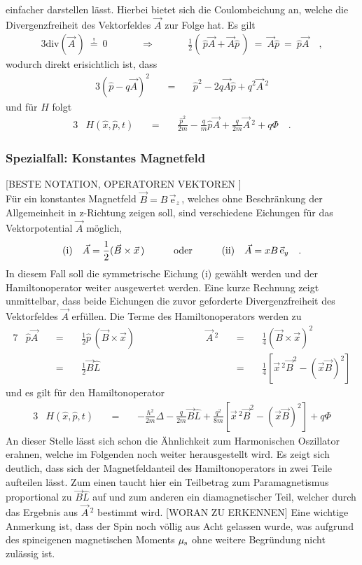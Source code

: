 \documentclass[a4paper,11pt, twoside]{article}
\newcommand{\+}{\dagger}
\renewcommand{\'}{\tt\textquotesingle}
\renewcommand{\it}{\mathit}
\renewcommand{\v}{\vec}
\renewcommand{\^}{\hat}
\renewcommand{\tt}{\text}
\renewcommand{\~}{\widetilde}
\begin{document}
einfacher darstellen lässt. Hierbei bietet sich die Coulombeichung an, welche die Divergenzfreiheit des Vektorfeldes $\v A$ zur Folge hat. Es gilt
\begin{alignat*}{3}
\tt{div}(\v A\,) \ \stackrel{!}{=} \ 0 &&\qquad \Rightarrow \qquad && \frac{1}{2}(\,\^p\v A + \v A\^p\,)\ =\  \v A\^p \ =\ \^p \v A \quad ,
\end{alignat*}
wodurch direkt erisichtlich ist, dass  
\begin{alignat*}{3}
(\^p -q \v A)^2 && \ =\ && \^p ^2 -2q \v A \^ p +q^2\v A \,^2 
\end{alignat*}
und für $H$ folgt
\begin{alignat*}{3}
& H(\^ x,\^ p,t)&& \ =\  && \frac{\^ p ^2}{2m} - \frac{q}{m}\^ p\v A +\frac{q}{2m}\v A\,^2+q\Phi  \quad .
\end{alignat*}


\subsubsection{Spezialfall: Konstantes Magnetfeld}
[BESTE NOTATION, OPERATOREN VEKTOREN ]\\
Für ein konstantes Magnetfeld $\v{B} = B\,\v{\tt{e}}_z\,$, welches ohne Beschränkung der Allgemeinheit in z-Richtung zeigen soll, sind verschiedene Eichungen für das Vektorpotential $\v A$ möglich, 
\begin{alignat*}{3}
(\tt{i})\quad \v A = \frac{1}{2}(\v B \times \v x \,) && \qquad \tt{oder} \qquad &&(\tt{ii})\quad \v A = xB\,\v{\tt e}_y \quad .
\end{alignat*}
In diesem Fall soll die symmetrische Eichung (i) gewählt werden und der Hamiltonoperator weiter ausgewertet werden. Eine kurze Rechnung zeigt unmittelbar, dass beide Eichungen die zuvor geforderte Divergenzfreiheit des Vektorfeldes $\v A$ erfüllen. Die Terme des Hamiltonoperators werden zu
\begin{alignat*}{7}
& \^p\v A && \ = \ && \frac{1}{2}\^p\,(\v B \times \v x)  && \qquad\qquad && \v A \,^2 &&\ =\ && \frac{1}{4}(\v B \times \v x)^2\\[2pt]
& && \ = \ && \frac{1}{2}\v B \^L 										&& \qquad\qquad && 		&&\ =\ && \frac{1}{4}\left [\v x\,^2 \v B^2 - (\v x \v B)^2 \right ]
\end{alignat*}
und es gilt für den Hamiltonoperator
\begin{alignat*}{3}
& H(\^ x,\^ p,t)&& \ =\  && -\frac{\hbar^2}{2m}\Delta - \frac{q}{2m}\v B \^L  +\frac{q^2}{8m}\left [\v x\,^2 \v B^2 - (\v x \v B)^2 \right ] +q\it\Phi
\end{alignat*}
An dieser Stelle lässt sich schon die Ähnlichkeit zum Harmonischen Oszillator erahnen, welche im Folgenden noch weiter herausgestellt wird. Es zeigt sich deutlich, dass sich der Magnetfeldanteil des Hamiltonoperators in zwei Teile aufteilen lässt. Zum einen taucht hier ein Teilbetrag zum Paramagnetismus proportional zu $\v B \^ L$ auf und zum anderen ein diamagnetischer Teil, welcher durch das Ergebnis aus $\v A \,^2$ bestimmt wird. [WORAN ZU ERKENNEN] 
Eine wichtige Anmerkung ist, dass der Spin noch völlig aus Acht gelassen wurde, was aufgrund des spineigenen magnetischen Moments $\mu_\tt s$ ohne weitere Begründung nicht zulässig ist. 
\end{document}
